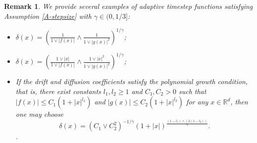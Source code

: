 \documentclass[preprint,12pt,compress]{elsarticle}
\newtheorem{remark}[theorem]{Remark}
\begin{document}
\begin{remark}
We provide several examples of adaptive timestep functions satisfying Assumption \ref{A-stepsize} with $\gamma \in (0, 1/3]$:
\begin{itemize}
	\item[(i)] $\delta (x) = {\left( {\frac{1}{{1 \vee \left| {f(x)} \right|}} \wedge \frac{1}{{1 \vee {{\left| {g(x)} \right|}^2}}}} \right)^{1/{\gamma }}}$;
	
	\item[(ii)] $\delta (x) = {\left( {\frac{{1 \vee \left| x \right|}}{{1 \vee \left| {f(x)} \right|}} \wedge \frac{{1 \vee {{\left| x \right|}^2}}}{{1 \vee {{\left| {g(x)} \right|}^2}}}} \right)^{1/{\gamma }}}$;
	
	\item[(iii)] If the drift and diffusion coefficients satisfy the polynomial growth condition, that is, there exist constants $l_1, l_2 \ge 1$ and  $C_1, C_2 > 0$ such that $\left| {f(x)} \right| \le C_1( {1 + {{\left| x \right|}^{{l_1}}}} )$ and $\left| {g(x)} \right| \le C_2( {1 + {{\left| x \right|}^{{l_2}}}} )$
	for any $x \in \mathbb{R}^d$, then one may choose 
	\begin{equation*}
		\delta (x) = {\left( {{C_1} \vee {C_2^2}} \right)^{ - 1/\gamma }}{\left( {1 + \left| x \right|} \right)^{\frac{{(1 - {l_1}) \wedge (2(1 - {l_2}))}}{\gamma }}}.
	\end{equation*}.
\end{itemize}
\end{remark}
\end{document}

